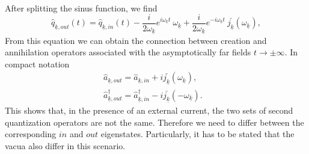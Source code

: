 \documentclass[12pt, titlepage]{article}
\begin{document}
After splitting the sinus function, we find 
\begin{equation}
\hat{q}_{\underline{k},out}(t) 
  =
  \hat{q}_{\underline{k},in}(t) 
  -
  	\dfrac{i}{2\omega_{\underline{k}}}e^{i\omega_{\underline{k}}t}\
  	\omega_{\underline{k}}
  +
  	\dfrac{i}{2\omega_{\underline{k}}}e^{-i\omega_{\underline{k}}t}\
  	\bar{j_{\underline{k}}}(\omega_{\underline{k}}),
\end{equation}
From this equation we can obtain the connection between creation and annihilation operators associated with the asymptotically far fields $ t\rightarrow \pm \infty $. In compact notation
\begin{subequations}
\begin{align}
\hat{a}_{\underline{k},out}=  \hat{a}_{\underline{k},in}+i
\bar{j_{\underline{k}}}(\omega_{\underline{k}}) ,
&\\
\hat{a}^{\dagger}_{\underline{k},out} = \hat{a}^{\dagger}_{\underline{k},in}
-i
\bar{j_{\underline{k}}}(-\omega_{\underline{k}})  .
\end{align}
\end{subequations}
This shows that, in the presence of an external current, the two sets of second quantization operators are not the same. Therefore we need to differ between the corresponding $ in $ and $ out $ eigenstates. Particularly, it has to be stated that the vacua also differ in this scenario.%
\end{document}
